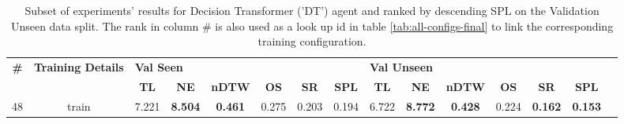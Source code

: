 \begin{table}
\centering
\caption{\label{tab:dt_rezero}Subset of experiments' results for Decision Transformer ('DT') agent and ranked by descending SPL on the Validation Unseen data split. The rank in column \# is also used as a look up id in table \ref{tab:all-configs-final} to link the corresponding training configuration.}
\begin{tabular}{@{\hskip3pt}c@{\hskip3pt}c@{\hskip3pt}c@{\hskip3pt}c@{\hskip3pt}c@{\hskip3pt}c@{\hskip3pt}c@{\hskip3pt}c@{\hskip3pt}c@{\hskip3pt}c@{\hskip3pt}c@{\hskip3pt}c@{\hskip3pt}c@{\hskip3pt}c@{\hskip3pt}c}
\toprule
\textbf{\#} & \textbf{Training Details} & \multicolumn{6}{l}{\textbf{Val Seen}} & \multicolumn{6}{l}{\textbf{Val Unseen}} \\
 \textbf{~} &                \textbf{~} &       \textbf{TL} &     \textbf{NE} &   \textbf{nDTW} & \textbf{OS} & \textbf{SR} & \textbf{SPL} &         \textbf{TL} &     \textbf{NE} &   \textbf{nDTW} & \textbf{OS} &     \textbf{SR} &    \textbf{SPL} \\
\midrule
         48 &                     train &             7.221 &  \textbf{8.504} &  \textbf{0.461} &       0.275 &       0.203 &        0.194 &               6.722 &  \textbf{8.772} &  \textbf{0.428} &       0.224 &  \textbf{0.162} &  \textbf{0.153} \\
\bottomrule
\end{tabular}
\end{table}
